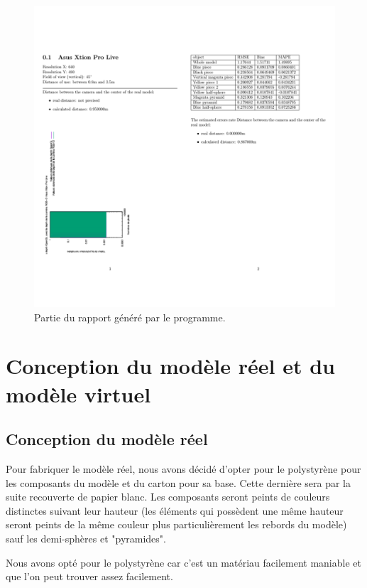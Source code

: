 \documentclass[a4paper, 12pt]{book}
\newcounter{program}[subsection]
\begin{document}
\begin{figure}[htbp]
 \includegraphics[scale=0.25]{images/report.png} \hspace{2cm}
  \caption{Partie du rapport généré par le programme.\label{fig-report}}
\end{figure}

\section{Conception du modèle réel et du modèle virtuel}
\subsection{Conception du modèle réel}
Pour fabriquer le modèle réel, nous avons décidé d'opter pour le polystyrène pour les composants du modèle et du carton pour sa base. Cette dernière sera par la suite recouverte de papier blanc. Les composants seront peints de couleurs distinctes suivant leur hauteur (les éléments qui possèdent une même hauteur seront peints de la même couleur plus particulièrement les rebords du modèle) sauf les demi-sphères et "pyramides".
\par Nous avons opté pour le polystyrène car c'est un matériau facilement maniable et que l'on peut trouver assez facilement.
\end{document}
